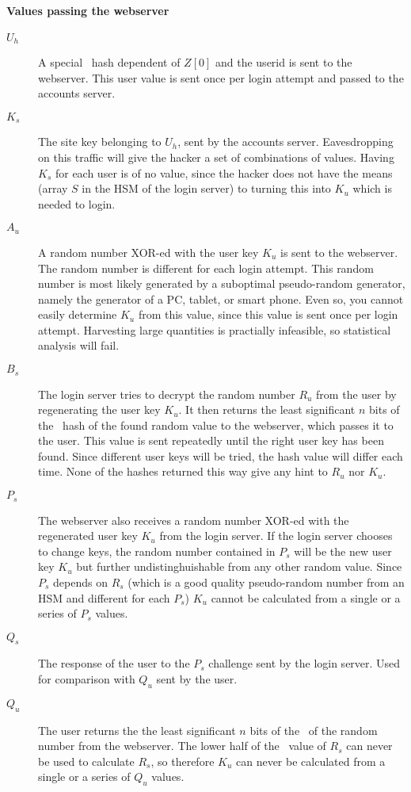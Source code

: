 \paragraph{Values passing the webserver}
\begin{description}
\item[$U_h$]	A special \SHA\ hash dependent of $Z[0]$ and the userid is sent to the webserver.
				This user value is sent once per login attempt and passed to the accounts server.
\item[$K_s$]	The site key belonging to $U_h$, sent by the accounts server.
				Eavesdropping on this traffic will give the hacker a set of combinations of values.
				Having $K_s$ for each user is of no value, since the hacker does not have the means
				(array $S$ in the HSM of the login server)
				to turning this into $K_u$ which is needed to login.
\item[$A_u$]	A random number XOR-ed with the user key $K_u$ is sent to the webserver.
				The random number is different for each login attempt.
				This random number is most likely generated by a suboptimal pseudo-random generator,
				namely the generator of a PC, tablet, or smart phone.
				Even so, you cannot easily determine $K_u$ from this value,
				since this value is sent once per login attempt.
				Harvesting large quantities is practially infeasible,
				so statistical analysis will fail.
\item[$B_s$]	The login server tries to decrypt the random number $R_u$ from the user by regenerating the user key $K_u$.
				It then returns the least significant $n$ bits of the \SHA\ hash of the found random value to the webserver,
				which passes it to the user.
				This value is sent repeatedly until the right user key has been found.
				Since different user keys will be tried, the hash value will differ each time.
				None of the hashes returned this way give any hint to $R_u$ nor $K_u$.
\item[$P_s$]	The webserver also receives a random number XOR-ed with the regenerated user key $K_u$ from the login server.
				If the login server chooses to change keys,
				the random number contained in $P_s$ will be the new user key $K_u$
				but further undistinghuishable from any other random value.
				Since $P_s$ depends on $R_s$
				(which is a good quality pseudo-random number from an HSM and different for each $P_s$)
				$K_u$ cannot be calculated from a single or a series of $P_s$ values.
\item[$Q_s$]	The response of the user to the $P_s$ challenge sent by the login server.
				Used for comparison with $Q_u$ sent by the user.
\item[$Q_u$]	The user returns the the least significant $n$ bits of the \SHA\ of the random number from the webserver.
				The lower half of the \SHA\ value of $R_s$ can never be used to calculate $R_s$,
				so therefore $K_u$ can never be calculated from a single or a series of $Q_u$ values.
\end{description}
